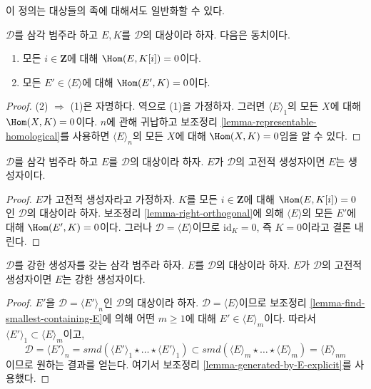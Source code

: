 \noindent
이 정의는 대상들의 족에 대해서도 일반화할 수 있다.

\begin{lemma}
\label{lemma-right-orthogonal}
$\mathcal{D}$를 삼각 범주라 하고 $E, K$를 $\mathcal{D}$의 대상이라
하자. 다음은 동치이다.
\begin{enumerate}
\item 모든 $i \in \mathbf{Z}$에 대해 $\Hom(E, K[i]) = 0$이다.
\item 모든 $E' \in \langle E \rangle$에 대해 $\Hom(E', K) = 0$이다.
\end{enumerate}
\end{lemma}

\begin{proof}
(2) $\Rightarrow$ (1)은 자명하다. 역으로 (1)을 가정하자. 그러면
$\langle E \rangle_1$의 모든 $X$에 대해 $\Hom(X, K) = 0$이다.
$n$에 관해 귀납하고 보조정리 \ref{lemma-representable-homological}를
사용하면 $\langle E \rangle_n$의 모든 $X$에 대해
$\Hom(X, K) = 0$임을 알 수 있다.
\end{proof}

\begin{lemma}
\label{lemma-classical-generator-generator}
$\mathcal{D}$를 삼각 범주라 하고 $E$를 $\mathcal{D}$의 대상이라 하자.
$E$가 $\mathcal{D}$의 고전적 생성자이면 $E$는 생성자이다.
\end{lemma}

\begin{proof}
$E$가 고전적 생성자라고 가정하자. $K$를 모든
$i \in \mathbf{Z}$에 대해 $\Hom(E, K[i]) = 0$인 $\mathcal{D}$의
대상이라 하자. 보조정리 \ref{lemma-right-orthogonal}에 의해
$\langle E \rangle$의 모든 $E'$에 대해 $\Hom(E', K) = 0$이다.
그러나 $\mathcal{D} = \langle E \rangle$이므로
$\text{id}_K = 0$, 즉 $K = 0$이라고 결론 내린다.
\end{proof}

\begin{lemma}
\label{lemma-classical-generator-strong-generator}
$\mathcal{D}$를 강한 생성자를 갖는 삼각 범주라 하자.
$E$를 $\mathcal{D}$의 대상이라 하자. $E$가 $\mathcal{D}$의
고전적 생성자이면 $E$는 강한 생성자이다.
\end{lemma}

\begin{proof}
$E'$을 $\mathcal{D} = \langle E' \rangle_n$인 $\mathcal{D}$의 대상이라
하자. $\mathcal{D} = \langle E \rangle$이므로 보조정리
\ref{lemma-find-smallest-containing-E}에 의해 어떤 $m \geq 1$에 대해
$E' \in \langle E \rangle_m$이다. 따라서
$\langle E' \rangle_1 \subset \langle E \rangle_m$이고,
$$
\mathcal{D} =
\langle E' \rangle_n = smd(
\langle E' \rangle_1 \star \ldots \star \langle E' \rangle_1)
\subset
smd(
\langle E \rangle_m \star \ldots \star \langle E \rangle_m)
=
\langle E \rangle_{nm}
$$
이므로 원하는 결과를 얻는다. 여기서 보조정리
\ref{lemma-generated-by-E-explicit}를 사용했다.
\end{proof}

